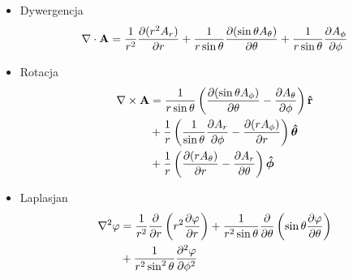 \documentclass[../main.tex]{subfiles}
\begin{document}
\begin{enumerate}
\begin{itemize}
            \item Dywergencja
            \begin{equation*}
                \nabla\cdot\mathbf{A}=\frac{1}{r^2}\pdv{(r^2A_r)}{r}+\frac{1}{r\sin\theta}\pdv{(\sin\theta A_\theta)}{\theta}+\frac{1}{r\sin\theta}\pdv{A_\phi}{\phi}
            \end{equation*}
            
            \item Rotacja
            \begin{equation*}
            \begin{split}
                \nabla\times\mathbf{A}&=\frac{1}{r\sin\theta}\left(\pdv{(\sin\theta A_\phi)}{\theta}-\pdv{A_\theta}{\phi}\right)\mathbf{\hat{r}}\\
                &+\frac{1}{r}\left(\frac{1}{\sin\theta}\pdv{A_r}{\phi}-\pdv{(rA_\phi)}{r}\right)\boldsymbol{\hat{\theta}}\\
                &+\frac{1}{r}\left(\pdv{(rA_\theta)}{r}-\pdv{A_r}{\theta}\right)\boldsymbol{\hat{\phi}}
            \end{split}
            \end{equation*}
            
            \item Laplasjan
            \begin{equation*}
            \begin{split}
                \nabla^2\varphi&=\frac{1}{r^2}\frac{\partial}{\partial r}\left(r^2\pdv{\varphi}{r}\right)+\frac{1}{r^2\sin\theta}\frac{\partial}{\partial\theta}\left(\sin\theta\pdv{\varphi}{\theta}\right)\\
                &+\frac{1}{r^2\sin^2\theta}\pdv[2]{\varphi}{\phi}
            \end{split}
            \end{equation*}
    \end{itemize}
\end{enumerate}
\end{document}

